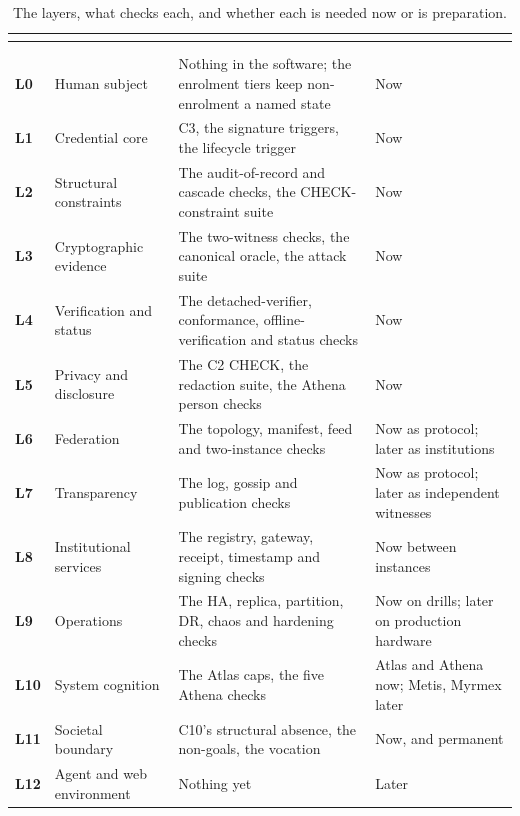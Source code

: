 {\footnotesize
\setlength{\tabcolsep}{4pt}\renewcommand{\arraystretch}{1.12}
\begin{xltabular}{\textwidth}{>{\bfseries}p{0.5in} >{\RaggedRight\arraybackslash}p{1.55in} >{\RaggedRight\arraybackslash}X >{\RaggedRight\arraybackslash}p{1.15in}}
\caption{The layers, what checks each, and whether each is needed now or is preparation.}\label{tab:layers}\\
\toprule
{} &  &  &  \\
\midrule
\endfirsthead
\toprule
{} &  &  &  \\
\midrule
\endhead
\midrule{}\\
\endfoot
\bottomrule
\endlastfoot
L0 & Human subject & Nothing in the software; the enrolment tiers keep non-enrolment a named state & Now \\
L1 & Credential core & C3, the signature triggers, the lifecycle trigger & Now \\
L2 & Structural constraints & The audit-of-record and cascade checks, the CHECK-constraint suite & Now \\
L3 & Cryptographic evidence & The two-witness checks, the canonical oracle, the attack suite & Now \\
L4 & Verification and status & The detached-verifier, conformance, offline-verification and status checks & Now \\
L5 & Privacy and disclosure & The C2 CHECK, the redaction suite, the Athena person checks & Now \\
L6 & Federation & The topology, manifest, feed and two-instance checks & Now as protocol; later as institutions \\
L7 & Transparency & The log, gossip and publication checks & Now as protocol; later as independent witnesses \\
L8 & Institutional services & The registry, gateway, receipt, timestamp and signing checks & Now between instances \\
L9 & Operations & The HA, replica, partition, DR, chaos and hardening checks & Now on drills; later on production hardware \\
L10 & System cognition & The Atlas caps, the five Athena checks & Atlas and Athena now; Metis, Myrmex later \\
L11 & Societal boundary & C10's structural absence, the non-goals, the vocation & Now, and permanent \\
L12 & Agent and web environment & Nothing yet & Later \\
\end{xltabular}
}
